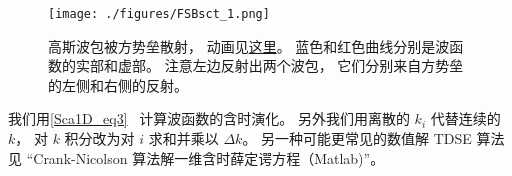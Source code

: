 
\begin{issues}
\issueDraft
\end{issues}


\begin{figure}[ht]
\centering
\texttt{[image: ./figures/FSBsct\_1.png]}
\caption{高斯波包被方势垒散射， 动画见\href{https://wuli.wiki/apps/FSBsct.html}{这里}。 蓝色和红色曲线分别是波函数的实部和虚部。 注意左边反射出两个波包， 它们分别来自方势垒的左侧和右侧的反射。} \label{FSBsct_fig1}
\end{figure}

我们用\autoref{Sca1D_eq3}~ 计算波函数的含时演化。 另外我们用离散的 $k_i$ 代替连续的 $k$， 对 $k$ 积分改为对 $i$ 求和并乘以 $\Delta{k}$。 另一种可能更常见的数值解 TDSE 算法见 “Crank-Nicolson 算法解一维含时薛定谔方程（Matlab)”。

